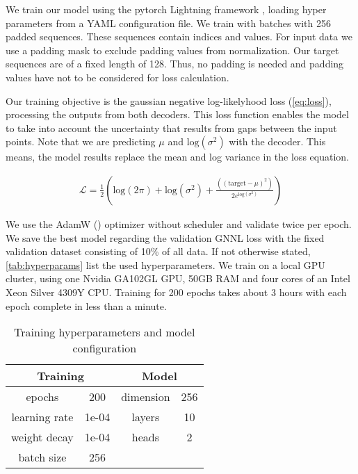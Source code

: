 We train our model using the pytorch Lightning framework \cite{falcon2019pytorch}, loading hyper parameters from a YAML configuration file. We train with batches with 256 padded sequences. These sequences contain indices and values. For input data we use a padding mask to exclude padding values from normalization. Our target sequences are of a fixed length of 128. Thus, no padding is needed and padding values have not to be considered for loss calculation.

Our training objective is the gaussian negative log-likelyhood loss (\autoref{eq:loss}), processing the outputs from both decoders. This loss function enables the model to take into account the uncertainty that results from gaps between the input points. Note that we are predicting $\mu$ and $\text{log} (\sigma^2)$ with the decoder. This means, the model results replace the mean and log variance in the loss equation.

\begin{align}
\mathcal{L} = \frac{1}{2}\left(\text{log}(2\pi) + \text{log}(\sigma^2) + \frac{((\text{target} - \mu)^2)}{2 e^{\text{log}(\sigma^2)}}\right) \label{eq:loss}
\end{align}

We use the AdamW (\citet{loshchilov2017fixing}) optimizer without scheduler and validate twice per epoch. We save the best model regarding the validation GNNL loss with the fixed validation dataset consisting of 10\% of all data. If not otherwise stated, \autoref{tab:hyperparams} list the used hyperparameters. We train on a local GPU cluster, using one Nvidia GA102GL GPU, 50GB RAM and four cores of an Intel Xeon Silver 4309Y CPU. Training for 200 epochs takes about 3 hours with each epoch complete in less than a minute.

\begin{table}[]
	\centering
	\caption{Training hyperparameters and model configuration}
	\begin{tabular}{c c c c}
		\toprule
		\multicolumn{2}{c}{Training} & \multicolumn{2}{c}{Model} \\
		\midrule
		epochs & 200 & dimension & 256 \\
		learning rate & 1e-04 & layers & 10\\
		weight decay & 1e-04 & heads & 2  \\
		batch size & 256 & \\\bottomrule
	\end{tabular}
	\label{tab:hyperparams}
\end{table}

